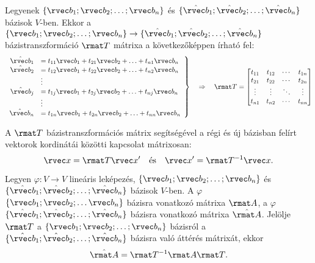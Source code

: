 \documentclass[a4paper, 12pt]{scrartcl}
\begin{document}
\begin{definition}[Bázistranszformáció]
  Legyenek $\{ \rvec b_1; \rvec b_2; \ldots; \rvec b_n \}$ és
  $\{ \hat{\rvec b}_1; \hat{\rvec b}_2; \ldots; \hat{\rvec b}_n \}$ bázisok
  $V$-ben. Ekkor a $\{ \rvec b_1; \rvec b_2; \ldots; \rvec b_n \} \rightarrow
    \{ \hat{\rvec b}_1; \hat{\rvec b}_2; \ldots; \hat{\rvec b}_n \}$
  bázistranszformáció $\rmat T$ mátrixa a következőképpen írható fel:
  $$
    \left.\begin{array}{rl}
      \hat{\rvec b}_1 & = t_{11} \rvec b_1 + t_{21} \rvec b_2 + \ldots + t_{n1} \rvec b_n \\
      \hat{\rvec b}_2 & = t_{12} \rvec b_1 + t_{22} \rvec b_2 + \ldots + t_{n2} \rvec b_n \\
                      & \vdots                                                            \\
      \hat{\rvec b}_j & = t_{1j} \rvec b_1 + t_{2j} \rvec b_2 + \ldots + t_{nj} \rvec b_n \\
                      & \vdots                                                            \\
      \hat{\rvec b}_n & = t_{1n} \rvec b_1 + t_{2n} \rvec b_2 + \ldots + t_{nn} \rvec b_n
    \end{array}\right\}
    \quad\Rightarrow\quad
    \rmat T = \begin{bmatrix}
      t_{11} & t_{12} & \cdots & t_{1n} \\
      t_{21} & t_{22} & \cdots & t_{2n} \\
      \vdots & \vdots & \ddots & \vdots \\
      t_{n1} & t_{n2} & \cdots & t_{nn}
    \end{bmatrix}
  $$
\end{definition}

\begin{note}
  A $\rmat T$ bázistranszformációs mátrix segítségével a régi és új bázisban
  felírt vektorok kordinátái közötti kapcsolat mátrixosan:
  $$
    \rvec x = \rmat T \rvec x'
    \quad\text{és}\quad
    \rvec x' = \rmat T^{-1} \rvec x
    \text.
  $$
\end{note}

\begin{theorem}
  Legyen $\varphi: V \rightarrow V$ lineáris leképezés,
  $\{ \rvec b_1; \rvec b_2; \ldots; \rvec b_n \}$ és $\{ \hat{\rvec b}_1;
    \hat{\rvec b}_2; \ldots; \hat{\rvec b}_n \}$ bázisok $V$-ben. A
  $\varphi$ $\{ \rvec b_1; \rvec b_2; \ldots \rvec b_n \}$ bázisra vonatkozó
  mátrixa $\rmat A$, a $\varphi$ $\{ \hat{\rvec b}_1; \hat{\rvec b}_2; \ldots;
    \hat{\rvec b}_n \}$ bázisra vonatkozó mátrixa $\hat{\rmat A}$. Jelölje
  $\rmat T$ a $\{ \rvec b_1; \rvec b_2; \ldots; \rvec b_n \}$ bázisról a
  $\{ \hat{\rvec b}_1; \hat{\rvec b}_2; \ldots; \hat{\rvec b}_n \}$ bázisra
  való áttérés mátrixát, ekkor
  $$
    \hat{\rmat A} = \rmat T^{-1} \rmat A \rmat T
    \text.
  $$
\end{theorem}
\end{document}
